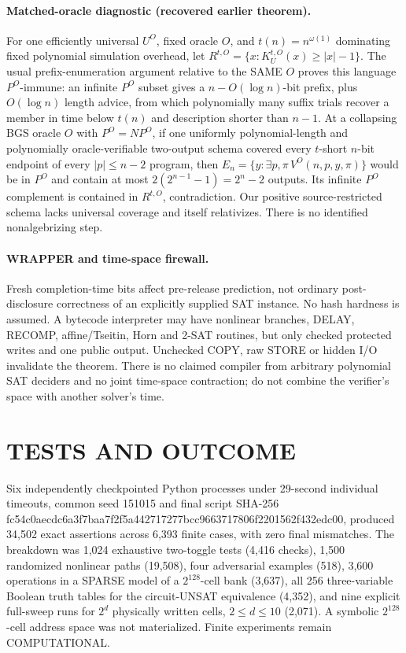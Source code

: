 \documentclass[11pt]{article}
\begin{document}
\paragraph{Matched-oracle diagnostic (recovered earlier theorem).}
For one efficiently universal $U^O$, fixed oracle $O$, and $t(n)=n^{\omega(1)}$ dominating fixed polynomial simulation overhead, let $R^{t,O}=\{x:K_U^{t,O}(x)\ge |x|-1\}$. The usual prefix-enumeration argument relative to the SAME $O$ proves this language $P^O$-immune: an infinite $P^O$ subset gives a $n-O(\log n)$-bit prefix, plus $O(\log n)$ length advice, from which polynomially many suffix trials recover a member in time below $t(n)$ and description shorter than $n-1$. At a collapsing BGS oracle $O$ with $P^O=NP^O$, if one uniformly polynomial-length and polynomially oracle-verifiable two-output schema covered every $t$-short $n$-bit endpoint of every $|p|\le n-2$ program, then $E_n=\{y:\exists p,\pi\,V^O(n,p,y,\pi)\}$ would be in $P^O$ and contain at most $2(2^{n-1}-1)=2^n-2$ outputs. Its infinite $P^O$ complement is contained in $R^{t,O}$, contradiction. Our positive source-restricted schema lacks universal coverage and itself relativizes. There is no identified nonalgebrizing step.

\paragraph{WRAPPER and time-space firewall.}
Fresh completion-time bits affect pre-release prediction, not ordinary post-disclosure correctness of an explicitly supplied SAT instance. No hash hardness is assumed. A bytecode interpreter may have nonlinear branches, DELAY, RECOMP, affine/Tseitin, Horn and 2-SAT routines, but only checked protected writes and one public output. Unchecked COPY, raw STORE or hidden I/O invalidate the theorem. There is no claimed compiler from arbitrary polynomial SAT deciders and no joint time-space contraction; do not combine the verifier's space with another solver's time.

\section{TESTS AND OUTCOME}
Six independently checkpointed Python processes under 29-second individual timeouts, common seed 151015 and final script SHA-256 fc54c0aecdc6a3f7baa7f2f5a442717277bcc9663717806f2201562f432edc00, produced 34,502 exact assertions across 6,393 finite cases, with zero final mismatches. The breakdown was 1,024 exhaustive two-toggle tests (4,416 checks), 1,500 randomized nonlinear paths (19,508), four adversarial examples (518), 3,600 operations in a SPARSE model of a $2^{128}$-cell bank (3,637), all 256 three-variable Boolean truth tables for the circuit-UNSAT equivalence (4,352), and nine explicit full-sweep runs for $2^d$ physically written cells, $2\le d\le10$ (2,071). A symbolic $2^{128}$-cell address space was not materialized. Finite experiments remain COMPUTATIONAL.
\end{document}
